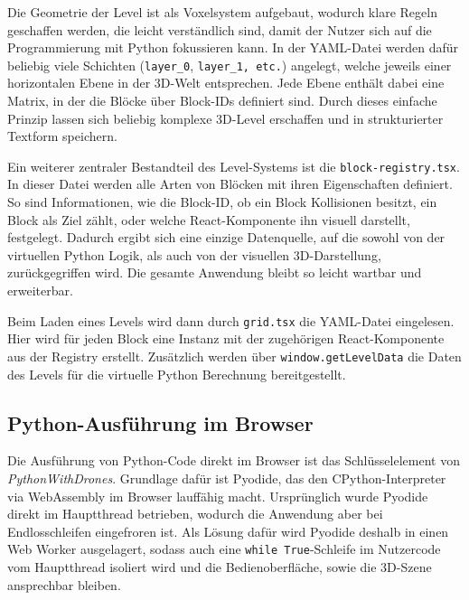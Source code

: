 \documentclass[a4paper,12pt]{article}
\begin{document}
	Die Geometrie der Level ist als Voxelsystem aufgebaut, wodurch klare 
	Regeln geschaffen werden, die leicht verständlich sind, damit der Nutzer 
	sich auf die Programmierung mit Python fokussieren kann. In der YAML-Datei 
	werden dafür beliebig viele Schichten (\texttt{layer\_0}, \texttt{layer\_1, etc.}) 
	angelegt, welche jeweils einer horizontalen Ebene in der 3D-Welt entsprechen. 
	Jede Ebene enthält dabei eine Matrix, in der die Blöcke über Block-IDs 
	definiert sind. Durch dieses einfache Prinzip lassen sich beliebig komplexe 
	3D-Level erschaffen und in strukturierter Textform speichern.
	
	Ein weiterer zentraler Bestandteil des Level-Systems ist die \texttt{block-registry.tsx}. 
	In dieser Datei werden alle Arten von Blöcken mit ihren Eigenschaften definiert. 
	So sind Informationen, wie die Block-ID, ob ein Block Kollisionen besitzt, 
	ein Block als Ziel zählt, oder welche React-Komponente ihn visuell darstellt, 
	festgelegt. Dadurch ergibt sich eine einzige Datenquelle, auf die sowohl von 
	der virtuellen Python Logik, als auch von der visuellen 3D-Darstellung, 
	zurückgegriffen wird. Die gesamte Anwendung bleibt so leicht wartbar und 
	erweiterbar.

	Beim Laden eines Levels wird dann durch \texttt{grid.tsx} die YAML-Datei 
	eingelesen. Hier wird für jeden Block eine Instanz mit der zugehörigen 
	React-Komponente aus der Registry erstellt. Zusätzlich werden über 
	\texttt{window.getLevelData} die Daten des Levels für die virtuelle 
	Python Berechnung bereitgestellt.

	\subsection{Python-Ausführung im Browser}
	Die Ausführung von Python-Code direkt im Browser ist das Schlüsselelement von 
	\textit{PythonWithDrones}. Grundlage dafür ist Pyodide, das den CPython-Interpreter 
	via WebAssembly im Browser lauffähig macht. Ursprünglich wurde Pyodide direkt im 
	Hauptthread betrieben, wodurch die Anwendung aber bei Endlosschleifen eingefroren ist. 
	Als Lösung dafür wird Pyodide deshalb in einen Web Worker ausgelagert, sodass auch 
	eine \texttt{while True}-Schleife im Nutzercode vom Hauptthread isoliert wird und 
	die Bedienoberfläche, sowie die 3D-Szene ansprechbar bleiben.
\end{document}
